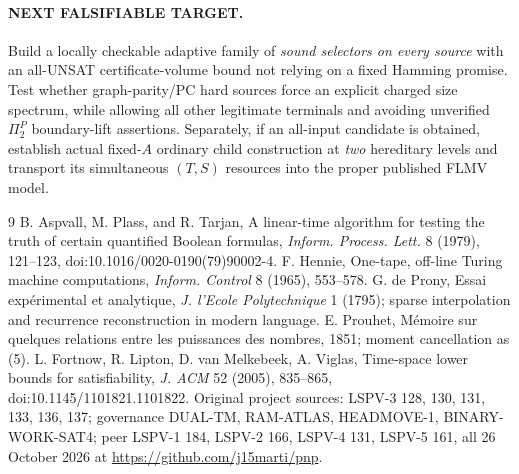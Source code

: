 \documentclass[11pt]{article}
\begin{document}
\paragraph{NEXT FALSIFIABLE TARGET.} Build a locally checkable adaptive family of \emph{sound selectors on every source} with an all-UNSAT certificate-volume bound not relying on a fixed Hamming promise. Test whether graph-parity/PC hard sources force an explicit charged size spectrum, while allowing all other legitimate terminals and avoiding unverified $\Pi_2^P$ boundary-lift assertions. Separately, if an all-input candidate is obtained, establish actual fixed-$A$ ordinary child construction at \emph{two} hereditary levels and transport its simultaneous $(T,S)$ resources into the proper published FLMV model.
\begin{thebibliography}{9}
 B. Aspvall, M. Plass, and R. Tarjan, A linear-time algorithm for testing the truth of certain quantified Boolean formulas, \emph{Inform. Process. Lett.} 8 (1979), 121--123, doi:10.1016/0020-0190(79)90002-4.
 F. Hennie, One-tape, off-line Turing machine computations, \emph{Inform. Control} 8 (1965), 553--578.
 G. de Prony, Essai exp\'erimental et analytique, \emph{J. l'Ecole Polytechnique} 1 (1795); sparse interpolation and recurrence reconstruction in modern language.
 E. Prouhet, M\'emoire sur quelques relations entre les puissances des nombres, 1851; moment cancellation as (5).
 L. Fortnow, R. Lipton, D. van Melkebeek, A. Viglas, Time-space lower bounds for satisfiability, \emph{J. ACM} 52 (2005), 835--865, doi:10.1145/1101821.1101822.
 Original project sources: LSPV-3 128, 130, 131, 133, 136, 137; governance DUAL-TM, RAM-ATLAS, HEADMOVE-1, BINARY-WORK-SAT4; peer LSPV-1 184, LSPV-2 166, LSPV-4 131, LSPV-5 161, all 26 October 2026 at \url{https://github.com/j15marti/pnp}.
\end{thebibliography}
\end{document}
